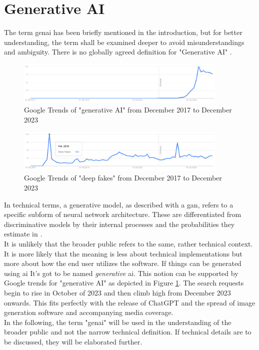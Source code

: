 \documentclass[
  a4paper,  %
  twoside,  %
  bibliography=totoc,
  headsepline,
  cleardoublepage=empty,
  parskip=half,
  draft=false
]{scrbook}
\begin{document}
\section{Generative AI}
\label{sec:genai}
The term \gls{genai} has been briefly mentioned in the introduction, but for better understanding, the term shall be examined deeper to avoid misunderstandings and ambiguity. There is no globally agreed definition for "Generative AI" \cite{garcia-penalvoWhatWeMean2023}.
\begin{figure}[h]
  \centering
  \includegraphics[width=0.9\textwidth]{./graphics/images/gtrends_genAI_1712-2312.png}
  \caption{Google Trends of "generative AI" from December 2017 to December 2023 \cite{googletrendsGoogleTrendsQuery}}
  \label{fig:gtrend-genai}
\end{figure}
\begin{figure}[h]
  \centering
  \includegraphics[width=0.9\textwidth]{./graphics/images/gtrends_deepfake_1712-2312.png}
  \caption{Google Trends of "deep fakes" from December 2017 to December 2023 \cite{googletrendsGoogleTrendsQuerya}}
  \label{fig:gtrend-deepfakes}
\end{figure}
In technical terms, a generative model, as described with a \gls{gan}, refers to a specific subform of neural network architecture. These are differentiated from discriminative models by their internal processes and the probabilities they estimate \cite{garcia-penalvoWhatWeMean2023} in \cite{gmComprehensiveSurveyAnalysis2020}. \\
It is unlikely that the broader public refers to the same, rather technical context. It is more likely that the meaning is less about technical implementations but more about how the end user utilizes the software. If things can be generated using \gls{ai} It's got to be named \textit{generative} \gls{ai}. This notion can be supported by Google trends for "generative AI" as depicted in Figure \ref{fig:gtrend-genai}. The search requests begin to rise in October of 2023 and then climb high from December 2023 onwards. This fits perfectly with the release of ChatGPT and the spread of image generation software and accompanying media coverage. \\
In the following, the term "\gls{genai}" will be used in the understanding of the broader public and not the narrow technical definition. If technical details are to be discussed, they will be elaborated further. 
\end{document}
